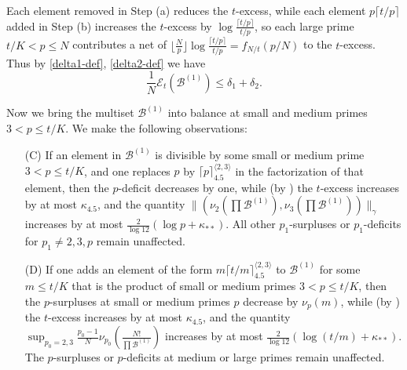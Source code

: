 \documentclass[12pt,a4paper,reqno]{amsart}
\numberwithin{equation}{section}
\theoremstyle{plain}
\theoremstyle{definition}
\newcommand\tuple{{\mathcal B}}
\newcommand\excess{{\mathcal{E}}}
\begin{document}
Each element removed in Step (a) reduces the $t$-excess, while each element $p \lceil t/p \rceil$ added in Step (b) increases the $t$-excess by $\log \frac{\lceil t/p \rceil}{t/p}$, so each large prime $t/K < p \leq N$ contributes a net of $\lfloor \frac{N}{p} \rfloor \log \frac{\lceil t/p \rceil}{t/p} = f_{N/t}(p/N)$ to the $t$-excess.  Thus by \eqref{delta1-def}, \eqref{delta2-def} we have
\begin{equation}\label{excess-1} 
  \frac{1}{N} \excess_t(\tuple^{(1)}) \leq \delta_1 + \delta_2.
\end{equation}

Now we bring the multiset $\tuple^{(1)}$ into balance at small and medium primes $3 < p \leq t/K$.  We make the following observations:
\begin{itemize}
\item[(C)]  If an element in $\tuple^{(1)}$ is divisible by some small or medium prime $3 < p \leq t/K$, and one replaces $p$ by $\lceil p \rceil^{\langle 2,3 \rangle}_{4.5}$ in the factorization of that element, then the $p$-deficit decreases by one, while (by ) the $t$-excess increases by at most $\kappa_{4.5}$, and the quantity $\| (\nu_2(\prod \tuple^{(1)}),\nu_3(\prod \tuple^{(1)}))\|_\gamma$ increases by at most $\frac{2}{\log 12}(\log p + \kappa_{**})$.  All other $p_1$-surpluses or $p_1$-deficits for $p_1 \neq 2,3,p$ remain unaffected.
\item[(D)]  If one adds an element of the form $m \lceil t/m \rceil^{\langle 2,3 \rangle}_{4.5}$ to $\tuple^{(1)}$ for some $m \leq t/K$ that is the product of small or medium primes $3 < p \leq t/K$, then the $p$-surpluses at small or medium primes $p$ decrease by $\nu_p(m)$, while (by ) the $t$-excess increases by at most $\kappa_{4.5}$, and the quantity $\sup_{p_0=2,3} \frac{p_0-1}{N} \nu_{p_0}\left(\frac{N!}{\prod \tuple^{(1)}}\right)$ increases by at most $\frac{2}{\log 12}(\log(t/m) + \kappa_{**})$.  The $p$-surpluses or $p$-deficits at medium or large primes remain unaffected.
\end{itemize}
\end{document}
